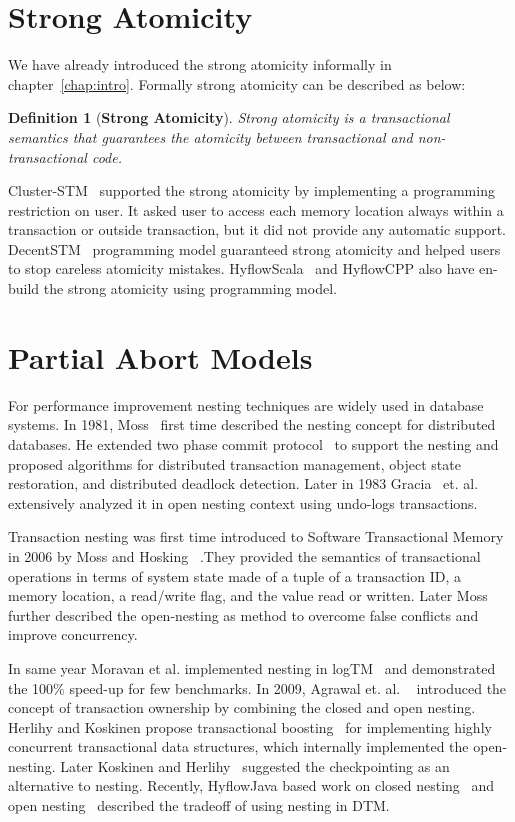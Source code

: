 \documentclass[12pt,english]{report}
\newtheorem{definition}{Definition}[section]
\begin{document}
\section{Strong Atomicity}
We have already introduced the strong atomicity informally in chapter~\ref{chap:intro}. Formally strong atomicity can be described as below:

\begin{definition}[\textbf{Strong Atomicity}] 
Strong atomicity is a transactional semantics that guarantees the atomicity between transactional and non-transactional code.
\end{definition}

Cluster-STM~\cite{Bocchino:2008:STM:1345206.1345242} supported the strong atomicity by implementing a programming restriction on user. It asked user to access each memory location always within a transaction or outside transaction, but it did not provide any automatic support. DecentSTM~\cite{DecentSTM:5470446} programming model guaranteed strong atomicity and helped users to stop careless atomicity mistakes. HyflowScala~\cite{turcuhyflow2} and HyflowCPP also have en-build the strong atomicity using programming model.

\section{Partial Abort Models}

For performance improvement nesting techniques are widely used in database systems. In 1981, Moss~\cite{moss1981nested} first time described the nesting concept for distributed databases. He extended two phase commit protocol~\cite{TwoPC:weikum1991principles} to support the nesting and proposed algorithms for distributed transaction management, object state restoration, and distributed deadlock detection. Later in 1983 Gracia~\cite{garcia1983using} et. al. extensively analyzed it in open nesting context using undo-logs transactions. 

Transaction nesting was first time introduced to Software Transactional Memory in 2006 by Moss and Hosking ~\cite{moss2006nested}.They provided the semantics of transactional operations in terms of system state made of a tuple of a transaction ID, a memory location, a read/write flag, and the value read or written. Later Moss ~\cite{moss2006open} further described the open-nesting as method to overcome false conflicts and improve concurrency. 

In same year Moravan et al. implemented nesting in logTM~\cite{moravan2006supporting} and demonstrated the 100\% speed-up for few benchmarks. In 2009, Agrawal et. al. ~\cite{agrawal2009safe} introduced the concept of transaction ownership by combining the closed and open nesting. Herlihy and Koskinen propose transactional boosting~\cite{herlihy2008transactional} for implementing highly concurrent transactional data structures, which internally implemented the open-nesting. Later Koskinen and Herlihy~\cite{koskinen2008checkpoints} suggested the checkpointing as an alternative to nesting. Recently, HyflowJava based work on closed nesting~\cite{turcu2012closed} and open nesting~\cite{turcu2012open} described the tradeoff of using nesting in DTM. 
\end{document}
